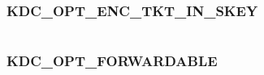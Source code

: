 \documentclass[letterpaper,10pt,english]{sphinxmanual}
\begin{document}
\begin{fulllineitems}
\label{appdev/refs/macros/KDC_OPT_DISABLE_TRANSITED_CHECK:KDC_OPT_DISABLE_TRANSITED_CHECK}
\end{fulllineitems}


\begin{tabulary}{\linewidth}{|L|L|}
\hline

 & 
\\\hline
\end{tabulary}



\subsubsection{KDC\_OPT\_ENC\_TKT\_IN\_SKEY}
\label{appdev/refs/macros/KDC_OPT_ENC_TKT_IN_SKEY:kdc-opt-enc-tkt-in-skey}\label{appdev/refs/macros/KDC_OPT_ENC_TKT_IN_SKEY::doc}\label{appdev/refs/macros/KDC_OPT_ENC_TKT_IN_SKEY:kdc-opt-enc-tkt-in-skey-data}

\begin{fulllineitems}
\label{appdev/refs/macros/KDC_OPT_ENC_TKT_IN_SKEY:KDC_OPT_ENC_TKT_IN_SKEY}
\end{fulllineitems}


\begin{tabulary}{\linewidth}{|L|L|}
\hline

 & 
\\\hline
\end{tabulary}



\subsubsection{KDC\_OPT\_FORWARDABLE}
\label{appdev/refs/macros/KDC_OPT_FORWARDABLE:kdc-opt-forwardable-data}\label{appdev/refs/macros/KDC_OPT_FORWARDABLE::doc}\label{appdev/refs/macros/KDC_OPT_FORWARDABLE:kdc-opt-forwardable}

\begin{fulllineitems}
\label{appdev/refs/macros/KDC_OPT_FORWARDABLE:KDC_OPT_FORWARDABLE}
\end{fulllineitems}
\end{document}
